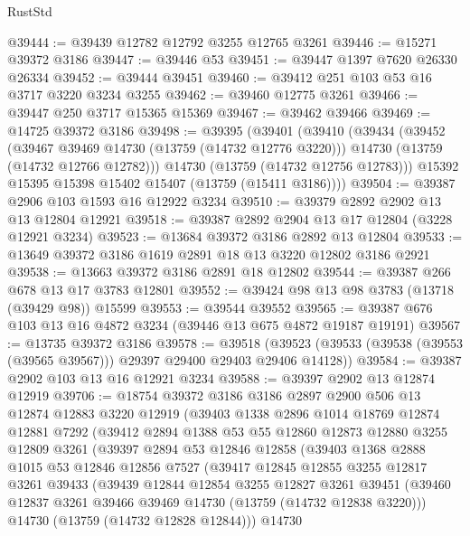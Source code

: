 \begin{lexlean}{RustStd}
\begin{coremodule}
@39444 := @39439 @12782 @12792 @3255 @12765 @3261
@39446 := @15271 @39372 @3186
@39447 := @39446 @53
@39451 := @39447 @1397 @7620 @26330 @26334
@39452 := @39444 @39451
@39460 := @39412 @251 @103 @53 @16 @3717 @3220 @3234 @3255
@39462 := @39460 @12775 @3261
@39466 := @39447 @250 @3717 @15365 @15369
@39467 := @39462 @39466
@39469 := @14725 @39372 @3186
@39498 := @39395
    (@39401
      (@39410
        (@39434
          (@39452
            (@39467 @39469 @14730 (@13759 (@14732 @12776 @3220)))
            @14730
            (@13759 (@14732 @12766 @12782)))
          @14730
          (@13759 (@14732 @12756 @12783)))
        @15392
        @15395
        @15398
        @15402
        @15407
        (@13759 (@15411 @3186))))
@39504 := @39387 @2906 @103 @1593 @16 @12922 @3234
@39510 := @39379 @2892 @2902 @13 @13 @12804 @12921
@39518 := @39387 @2892 @2904 @13 @17 @12804 (@3228 @12921 @3234)
@39523 := @13684 @39372 @3186 @2892 @13 @12804
@39533 := @13649 @39372 @3186 @1619 @2891 @18 @13 @3220 @12802 @3186 @2921
@39538 := @13663 @39372 @3186 @2891 @18 @12802
@39544 := @39387 @266 @678 @13 @17 @3783 @12801
@39552 := @39424 @98 @13 @98 @3783 (@13718 (@39429 @98)) @15599
@39553 := @39544 @39552
@39565 := @39387 @676 @103 @13 @16 @4872 @3234 (@39446 @13 @675 @4872 @19187 @19191)
@39567 := @13735 @39372 @3186
@39578 := @39518
    (@39523 (@39533 (@39538 (@39553 (@39565 @39567))) @29397 @29400 @29403 @29406 @14128))
@39584 := @39387 @2902 @103 @13 @16 @12921 @3234
@39588 := @39397 @2902 @13 @12874 @12919
@39706 := @18754
    @39372
    @3186
    @3186
    @2897
    @2900
    @506
    @13
    @12874
    @12883
    @3220
    @12919
    (@39403
      @1338
      @2896
      @1014
      @18769
      @12874
      @12881
      @7292
      (@39412
        @2894
        @1388
        @53
        @55
        @12860
        @12873
        @12880
        @3255
        @12809
        @3261
        (@39397
          @2894
          @53
          @12846
          @12858
          (@39403
            @1368
            @2888
            @1015
            @53
            @12846
            @12856
            @7527
            (@39417
              @12845
              @12855
              @3255
              @12817
              @3261
              @39433
              (@39439
                @12844
                @12854
                @3255
                @12827
                @3261
                @39451
                (@39460 @12837 @3261 @39466 @39469 @14730 (@13759 (@14732 @12838 @3220)))
                @14730
                (@13759 (@14732 @12828 @12844)))
              @14730

\end{coremodule}
\end{lexlean}
